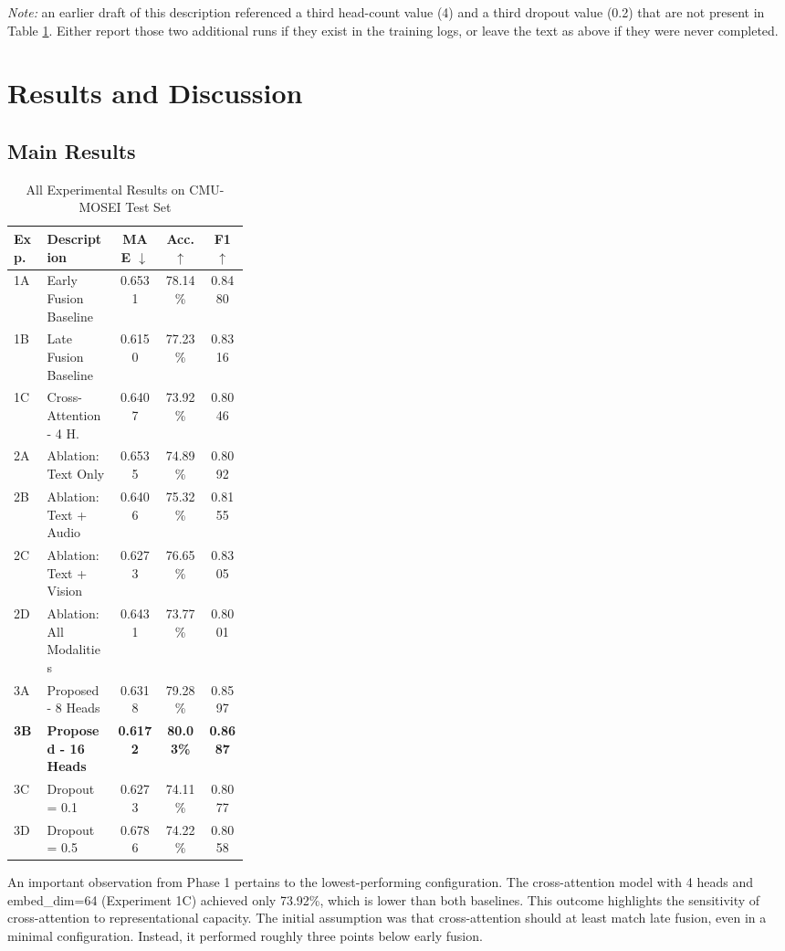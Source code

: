 \documentclass[conference]{IEEEtran}
\begin{document}
\textit{Note:} an earlier draft of this description referenced a third head-count value (4) and a third dropout value (0.2) that are not present in Table \ref{tab:results}. Either report those two additional runs if they exist in the training logs, or leave the text as above if they were never completed.

\section{Results and Discussion}

\subsection{Main Results}

\begin{table}[h]
\renewcommand{\arraystretch}{1.3}
\caption{All Experimental Results on CMU-MOSEI Test Set}
\label{tab:results}
\centering
\begin{tabular}{|l|p{0.3\linewidth}|c|c|c|}
\hline
\textbf{Exp.} & \textbf{Description} & \textbf{MAE $\downarrow$} & \textbf{Acc. $\uparrow$} & \textbf{F1 $\uparrow$} \\
\hline
1A & Early Fusion Baseline & 0.6531 & 78.14\% & 0.8480 \\
1B & Late Fusion Baseline & 0.6150 & 77.23\% & 0.8316 \\
1C & Cross-Attention - 4 H. & 0.6407 & 73.92\% & 0.8046 \\
\hline
2A & Ablation: Text Only & 0.6535 & 74.89\% & 0.8092 \\
2B & Ablation: Text + Audio & 0.6406 & 75.32\% & 0.8155 \\
2C & Ablation: Text + Vision & 0.6273 & 76.65\% & 0.8305 \\
2D & Ablation: All Modalities & 0.6431 & 73.77\% & 0.8001 \\
\hline
3A & Proposed - 8 Heads & 0.6318 & 79.28\% & 0.8597 \\
\textbf{3B} & \textbf{Proposed - 16 Heads} & \textbf{0.6172} & \textbf{80.03\%} & \textbf{0.8687} \\
3C & Dropout = 0.1 & 0.6273 & 74.11\% & 0.8077 \\
3D & Dropout = 0.5 & 0.6786 & 74.22\% & 0.8058 \\
\hline
\end{tabular}
\end{table}

An important observation from Phase 1 pertains to the lowest-performing configuration. The cross-attention model with 4 heads and embed\_dim=64 (Experiment 1C) achieved only 73.92\%, which is lower than both baselines. This outcome highlights the sensitivity of cross-attention to representational capacity. The initial assumption was that cross-attention should at least match late fusion, even in a minimal configuration. Instead, it performed roughly three points below early fusion.
\end{document}
